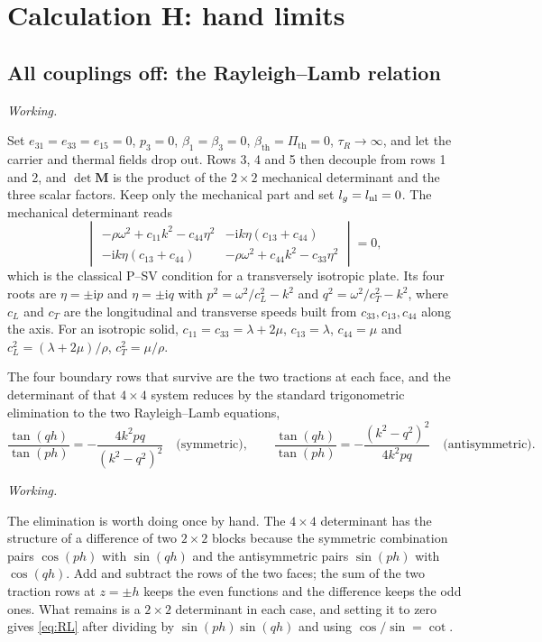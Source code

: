 \documentclass[11pt,a4paper]{article}
\newif\ifshowworked \showworkedtrue
\newenvironment{worked}{\ifshowworked\par\smallskip\noindent\textit{Working.}\par\else\setbox0\vbox\bgroup\fi}{\ifshowworked\par\smallskip\else\egroup\fi}
\newcommand{\bth}{\beta_{\mathrm{th}}}
\newcommand{\Pth}{\Pi_{\mathrm{th}}}
\newcommand{\ii}{\mathrm{i}}
\begin{document}
\section{Calculation H: hand limits}\label{sec:H}

\subsection{All couplings off: the Rayleigh--Lamb relation}

\begin{worked}
Set $e_{31}=e_{33}=e_{15}=0$, $p_3=0$, $\beta_1=\beta_3=0$, $\bth=\Pth=0$, $\tau_R\to\infty$, and let the
carrier and thermal fields drop out. Rows 3, 4 and 5 then decouple from rows 1 and 2, and $\det\mathbf M$ is
the product of the $2\times2$ mechanical determinant and the three scalar factors. Keep only the mechanical
part and set $l_g=l_{\rm nl}=0$. The mechanical determinant reads
\[
\begin{vmatrix}
-\rho\omega^2+c_{11}k^2-c_{44}\eta^2 & -\ii k\eta(c_{13}+c_{44})\\
-\ii k\eta(c_{13}+c_{44}) & -\rho\omega^2+c_{44}k^2-c_{33}\eta^2
\end{vmatrix}=0 ,
\]
which is the classical P--SV condition for a transversely isotropic plate. Its four roots are
$\eta=\pm\ii p$ and $\eta=\pm\ii q$ with $p^2=\omega^2/c_L^2-k^2$ and $q^2=\omega^2/c_T^2-k^2$, where
$c_L$ and $c_T$ are the longitudinal and transverse speeds built from $c_{33},c_{13},c_{44}$ along the
axis. For an isotropic solid, $c_{11}=c_{33}=\lambda+2\mu$, $c_{13}=\lambda$, $c_{44}=\mu$ and
$c_L^2=(\lambda+2\mu)/\rho$, $c_T^2=\mu/\rho$.
\end{worked}

\noindent The four boundary rows that survive are the two tractions at each face, and the determinant of
that $4\times4$ system reduces by the standard trigonometric elimination to the two Rayleigh--Lamb
equations,
\begin{equation}\label{eq:RL}
\frac{\tan(qh)}{\tan(ph)}=-\frac{4k^2pq}{(k^2-q^2)^2}\quad\text{(symmetric)},\qquad
\frac{\tan(qh)}{\tan(ph)}=-\frac{(k^2-q^2)^2}{4k^2pq}\quad\text{(antisymmetric)} .
\end{equation}

\begin{worked}
The elimination is worth doing once by hand. The $4\times4$ determinant has the structure of a difference of
two $2\times2$ blocks because the symmetric combination pairs $\cos(ph)$ with $\sin(qh)$ and the
antisymmetric pairs $\sin(ph)$ with $\cos(qh)$. Add and subtract the rows of the two faces; the sum of the
two traction rows at $z=\pm h$ keeps the even functions and the difference keeps the odd ones. What remains
is a $2\times2$ determinant in each case, and setting it to zero gives \eqref{eq:RL} after dividing by
$\sin(ph)\sin(qh)$ and using $\cos/\sin=\cot$.
\end{worked}
\end{document}
